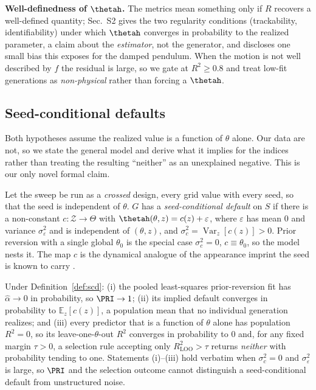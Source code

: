 \documentclass[10pt,twocolumn,letterpaper]{article}
\begin{document}
\textbf{Well-definedness of $\thetah$.}
The metrics mean something only if $R$ recovers a well-defined quantity;
Sec.~S2 gives the two regularity conditions (trackability,
identifiability) under which $\thetah$ converges in probability to the
realized parameter, a claim about the \emph{estimator}, not the
generator, and discloses one small bias this exposes for the damped
pendulum. When the motion is not well described by $f$ the residual is
large, so we gate at $R^2\!\ge\!0.8$ and treat low-fit generations as
\emph{non-physical} rather than forcing a $\thetah$.

\subsection{Seed-conditional defaults}
\label{sec:seedtheory}

Both hypotheses assume the realized value is a function of $\theta$ alone.
Our data are not, so we state the general model and derive what it implies
for the indices rather than treating the resulting ``neither'' as an
unexplained negative. This is our only novel formal claim.

\begin{definition}
\label{def:scd}
Let the sweep be run as a \emph{crossed} design, every grid value with every
seed, so that the seed is independent of $\theta$. $G$ has a
\emph{seed-conditional default} on $S$ if there is a non-constant
$c:\mathcal{Z}\to\Theta$ with $\thetah(\theta,z)=c(z)+\varepsilon$, where
$\varepsilon$ has mean $0$ and variance $\sigma_\varepsilon^2$ and is
independent of $(\theta,z)$, and $\sigma_c^2=\operatorname{Var}_z[c(z)]>0$.
Prior reversion with a single global $\theta_0$ is the special case
$\sigma_c^2=0$, $c\equiv\theta_0$, so the model nests it. The map $c$ is the
dynamical analogue of the appearance imprint the seed is known to carry
\citep{xu2025goodseed}.
\end{definition}

\begin{proposition}
\label{prop:misspec}
Under Definition~\ref{def:scd}: (i) the pooled least-squares prior-reversion
fit has $\hat\alpha\to0$ in probability, so $\PRI\to1$; (ii) its implied
default converges in probability to $\mathbb{E}_z[c(z)]$, a population mean
that no individual generation realizes; and (iii) every predictor that is a
function of $\theta$ alone has population $R^2=0$, so its
leave-one-$\theta$-out $R^2$ converges in probability to $0$ and, for any
fixed margin $\tau>0$, a selection rule accepting only
$R^2_{\mathrm{LOO}}>\tau$ returns \emph{neither} with probability tending to
one. Statements (i)--(iii) hold verbatim when $\sigma_c^2=0$ and
$\sigma_\varepsilon^2$ is large, so $\PRI$ and the selection outcome cannot
distinguish a seed-conditional default from unstructured noise.
\end{proposition}
\end{document}
